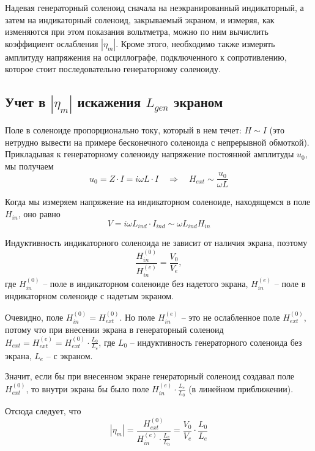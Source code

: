 Надевая генераторный соленоид сначала на неэкранированный индикаторный, а затем на индикаторный соленоид, закрываемый экраном, и измеряя, как изменяются при этом показания вольтметра, можно по ним вычислить коэффициент ослабления $|\eta_m|$. Кроме этого, необходимо также измерять амплитуду напряжения на осциллографе, подключенного к сопротивлению, которое стоит последовательно генераторному соленоиду.

\subsection{Учет в $|\eta_m|$ искажения $L_{gen}$ экраном}

Поле в соленоиде пропорционально току, который в нем течет: $H\sim I$ (это нетрудно вывести на примере бесконечного соленоида с непрерывной обмоткой). Прикладывая к генераторному соленоиду напряжение постоянной амплитуды $u_0$, мы получаем
\begin{equation}
	u_0=Z\cdot I=i\omega L\cdot I \quad\Rightarrow\quad H_{ext}\sim \frac{u_0}{\omega L}
\end{equation}

Когда мы измеряем напряжение на индикаторном соленоиде, находящемся в поле $H_{in}$, оно равно 
\begin{equation}
	V=i\omega L_{ind}\cdot I_{ind} \sim \omega  L_{ind} H_{in}
\end{equation}

Индуктивность индикаторного соленоида не зависит от наличия экрана, поэтому
\begin{equation}
	\frac{H_{in}^{(0)}}{H_{in}^{(e)}}=\frac{V_0}{V_e},
\end{equation}
где $H_{in}^{(0)}$ -- поле в индикаторном соленоиде без надетого экрана, $H_{in}^{(e)}$ -- поле в индикаторном соленоиде с надетым экраном.

Очевидно, поле $H_{in}^{(0)}=H_{ext}^{(0)}$. Но поле $H_{in}^{(e)}$ -- это не ослабленное поле $H_{ext}^{(0)}$, потому что при внесении экрана в генераторный соленоид $H_{ext}=H_{ext}^{(e)}=H_{ext}^{(0)}\cdot\frac{L_0}{L_e}$, где $L_0$ -- индуктивность генераторного соленоида без экрана, $L_e$ -- с экраном.

Значит, если бы при внесенном экране генераторный соленоид создавал поле $H_{ext}^{(0)}$, то внутри экрана бы было поле $H_{in}^{(e)}\cdot\frac{L_e}{L_0}$ (в линейном приближении).

Отсюда следует, что
\begin{equation}
	|\eta_m|=\frac{H_{ext}^{(0)}}{H_{in}^{(e)}\cdot\frac{L_e}{L_0}}=\frac{V_0}{V_e}\cdot\frac{L_0}{L_e}
\end{equation}

